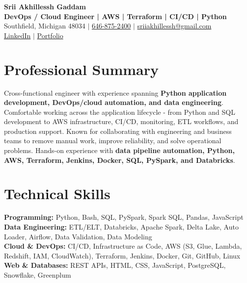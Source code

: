 \documentclass[letterpaper,10pt]{article}
\begin{document}
\fontsize{9.35pt}{10.45pt}\selectfont

\begin{center}
    {\LARGE \textbf{Srii Akhillessh Gaddam}} \\[-1pt]
    \textbf{DevOps / Cloud Engineer | AWS | Terraform | CI/CD | Python} \\[2pt]
    Southfield, Michigan 48034 $|$
    \href{tel:6468752400}{646-875-2400} $|$
    \href{mailto:sriiakhillessh@gmail.com}{sriiakhillessh@gmail.com} \\[1pt]
    \href{https://www.linkedin.com/in/srii-akhiilessh-gaddam-b48668191/}{LinkedIn} $|$
    \href{https://sriiakhillesshg.github.io/portfolio/}{Portfolio}
\end{center}
\vspace{-8pt}

\section{Professional Summary}
\small{Cross-functional engineer with experience spanning \textbf{Python application development, DevOps/cloud automation, and data engineering}. Comfortable working across the application lifecycle - from Python and SQL development to AWS infrastructure, CI/CD, monitoring, ETL workflows, and production support. Known for collaborating with engineering and business teams to remove manual work, improve reliability, and solve operational problems. Hands-on experience with \textbf{data pipeline automation, Python, AWS, Terraform, Jenkins, Docker, SQL, PySpark, and Databricks}.}

\section{Technical Skills}
\small{
\textbf{Programming:} Python, Bash, SQL, PySpark, Spark SQL, Pandas, JavaScript \\
\textbf{Data Engineering:} ETL/ELT, Databricks, Apache Spark, Delta Lake, Auto Loader, Airflow, Data Validation, Data Modeling \\
\textbf{Cloud \& DevOps:} CI/CD, Infrastructure as Code, AWS (S3, Glue, Lambda, Redshift, IAM, CloudWatch), Terraform, Jenkins, Docker, Git, GitHub, Linux \\
\textbf{Web \& Databases:} REST APIs, HTML, CSS, JavaScript, PostgreSQL, Snowflake, Greenplum
}
\end{document}

